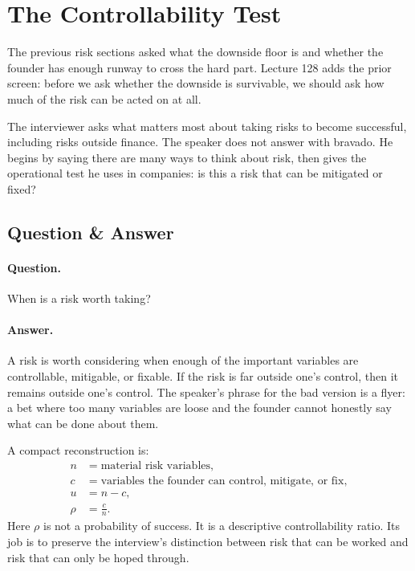\documentclass[11pt,oneside]{book}
\begin{document}

\section{The Controllability Test}

The previous risk sections asked what the downside floor is and whether the founder has enough runway to cross the hard part. Lecture 128 adds the prior screen: before we ask whether the downside is survivable, we should ask how much of the risk can be acted on at all.

The interviewer asks what matters most about taking risks to become successful, including risks outside finance. The speaker does not answer with bravado. He begins by saying there are many ways to think about risk, then gives the operational test he uses in companies: is this a risk that can be mitigated or fixed?

\subsection{Question \& Answer}

\paragraph{Question.}
When is a risk worth taking?

\paragraph{Answer.}
A risk is worth considering when enough of the important variables are controllable, mitigable, or fixable. If the risk is far outside one's control, then it remains outside one's control. The speaker's phrase for the bad version is a flyer: a bet where too many variables are loose and the founder cannot honestly say what can be done about them.

A compact reconstruction is:
\begin{align}
n&=\text{material risk variables},\\
c&=\text{variables the founder can control, mitigate, or fix},\\
u&=n-c,\\
\rho&=\frac{c}{n}.
\end{align}
Here \(\rho\) is not a probability of success. It is a descriptive controllability ratio. Its job is to preserve the interview's distinction between risk that can be worked and risk that can only be hoped through.
\end{document}

